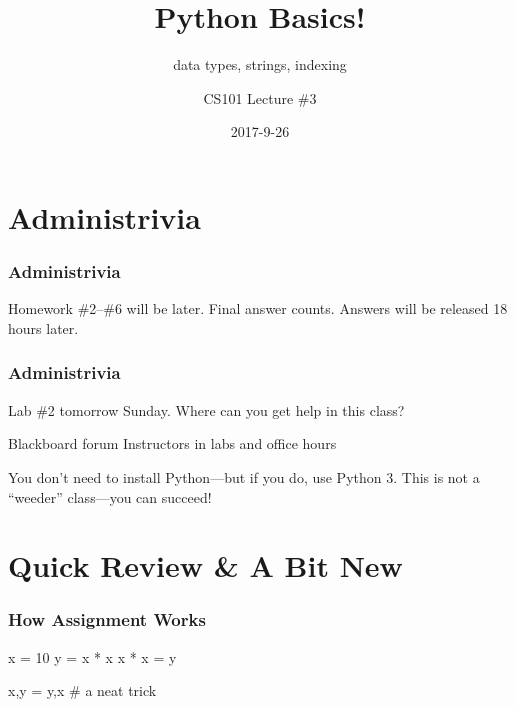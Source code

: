 \documentclass[11pt]{beamer}
\title{Python Basics!}
\subtitle{data types, strings, indexing}
\author{CS101 Lecture \#3}
\date{2017-9-26}
\begin{document}
  \setcounter{showProgressBar}{0}
  \setcounter{showSlideNumbers}{0}

\frame{\titlepage}

\setcounter{framenumber}{0}
\setcounter{showProgressBar}{1}
\setcounter{showSlideNumbers}{1}

\section{Administrivia}

\begin{frame}
  \frametitle{Administrivia}
  \Enlarge
  \begin{itemize}
  \mysubitem  Homework \#2--\#6 will be later. \pause
  \mysubitem  Final answer counts. \pause
  \mysubitem  Answers will be released 18 hours later.
  \end{itemize}
\end{frame}

\begin{frame}
  \frametitle{Administrivia}
  \Enlarge
  \begin{itemize}
  \myitem  Lab \#2 tomorrow Sunday. \pause
  \myitem  Where can you get help in this class?
    \begin{itemize}
    \mysubitem  Blackboard forum 
    \mysubitem  Instructors in labs and office hours 
    \end{itemize} \pause
  \myitem  You don't need to install Python---but if you do, use Python 3. \pause
  \myitem  This is not a ``weeder'' class---you can succeed!
  \end{itemize}
\end{frame}

\section{Quick Review \& A Bit New}

\begin{frame}[fragile]
  \frametitle{How Assignment Works}
  \Enlarge

  \begin{semiverbatim}
x = 10 \pause
y = x * x \pause
x * x = y \pause

x,y = y,x  # a neat trick
  \end{semiverbatim}
\end{frame}
\end{document}
